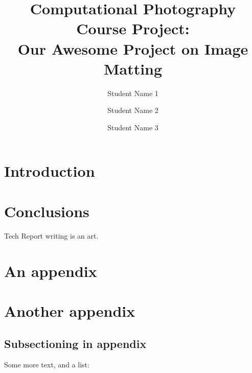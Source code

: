 \documentclass[12pt, letterpaper, twoside]{article}
\title{\textbf{Computational Photography Course Project:\\Our Awesome Project on Image Matting}} %
\author{Student Name 1 \and Student Name 2 \and Student Name 3} %
\affiliation{Ontario Tech University} %
\begin{document}
\maketitle

\begin{abstract}
    \noindent
    
    \blindtext[1] %

\end{abstract}

\vspace{2.5cm}


\thispagestyle{firstpage}

\pagebreak


\newgeometry{} %

\section{Introduction}
\label{sec:intro}

\blindmathpaper %

\section{Conclusions}
\label{sec:conc}

Tech Report writing is an art.




% 
% 

\appendix

\section{An appendix}

\blindtext %

\section{Another appendix}

\subsection*{Subsectioning in appendix}

Some more text, and a list:

\blindenumerate %
\end{document}

